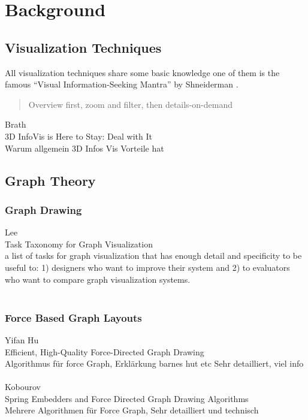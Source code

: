 \chapter{Background}

\section{Visualization Techniques}

All visualization techniques share some basic knowledge one of them is the famous “Visual Information-Seeking Mantra” by Shneiderman \cite{shneiderman_eyes_1996}.
\begin{quotation}
    Overview first, zoom and filter, then details-on-demand
\end{quotation}

Brath \\
3D InfoVis is Here to Stay: Deal with It\\
Warum allgemein 3D Infos Vis Vorteile hat\\

\section{Graph Theory}

\subsection{Graph Drawing}

Lee\\
Task Taxonomy for Graph Visualization\\
a list of tasks for graph visualization that has
enough detail and specificity to be useful to: 1) designers who
want to improve their system and 2) to evaluators who want to
compare graph visualization systems.\\
\\

\subsection{Force Based Graph Layouts}

Yifan Hu\\
Efficient, High-Quality Force-Directed Graph Drawing\\
Algorithmus für force Graph,  Erklärkung barnes hut etc Sehr detailliert, viel info\\
\\
Kobourov\\
Spring Embedders and Force Directed Graph Drawing Algorithms\\
Mehrere Algorithmen für Force Graph, Sehr detailliert und technisch \\
\\

